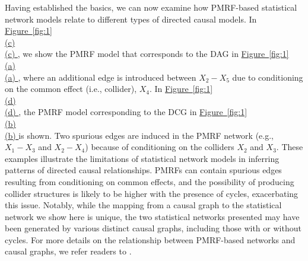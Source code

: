 \documentclass[twoside, 11pt]{article}
\newcommand*{\figref}[2][]{%
  \hyperref[{fig:#2}]{%
    Figure~\ref*{fig:#2}%
    \ifx\\#1\\%
    \else
      #1%
    \fi
  }%
}
\begin{document}
Having established the basics, we can now examine how PMRF-based statistical network models relate to different types of directed causal models. In \figref[(c)]{1}, we show the PMRF model that corresponds to the DAG in \figref[(a)]{1}, where an additional edge is introduced between $X_2 - X_5$ due to conditioning on the common effect (i.e., collider), $X_4$. In \figref[(d)]{1}, the PMRF model corresponding to the DCG in \figref[(b)]{1} is shown. Two spurious edges are induced in the PMRF network (e.g., $X_1 - X_3$ and $X_2 - X_4$) because of conditioning on the colliders $X_2$ and $X_3$. These examples illustrate the limitations of statistical network models in inferring patterns of directed causal relationships. PMRFs can contain spurious edges resulting from conditioning on common effects, and the possibility of producing collider structures is likely to be higher with the presence of cycles, exacerbating this issue. Notably, while the mapping from a causal graph to the statistical network we show here is unique, the two statistical networks presented may have been generated by various distinct causal graphs, including those with or without cycles. For more details on the relationship between PMRF-based networks and causal graphs, we refer readers to \cite{Ryan2022}.
\end{document}
